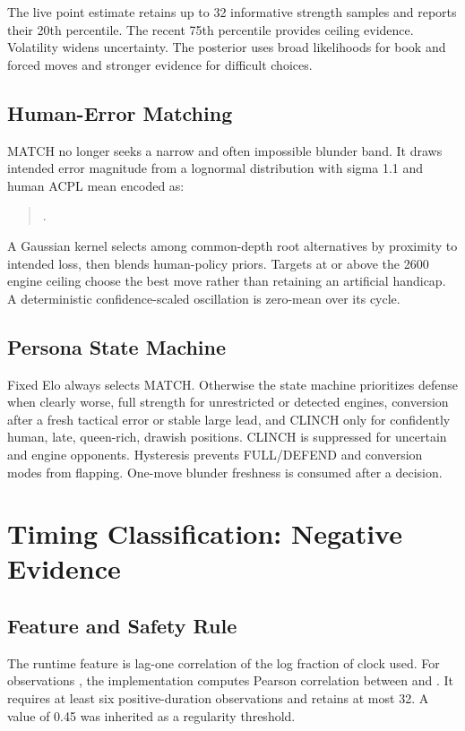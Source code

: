 \documentclass[conference]{IEEEtranSSP}
\newcommand{\code}[1]{\texttt{\detokenize{#1}}}
\begin{document}
The live point estimate retains up to 32 informative strength samples and reports their 20th percentile. The recent 75th percentile provides ceiling evidence. Volatility widens uncertainty. The posterior uses broad likelihoods for book and forced moves and stronger evidence for difficult choices.

\subsection{Human-Error Matching}
MATCH no longer seeks a narrow and often impossible blunder band. It draws intended error magnitude from a lognormal distribution with sigma 1.1 and human ACPL mean encoded as:

\begin{quote}
\code{ACPL_human(E) = 300 * exp(-E / 900)}.
\end{quote}

A Gaussian kernel selects among common-depth root alternatives by proximity to intended loss, then blends human-policy priors. Targets at or above the 2600 engine ceiling choose the best move rather than retaining an artificial handicap. A deterministic confidence-scaled oscillation is zero-mean over its cycle.

\subsection{Persona State Machine}
Fixed Elo always selects MATCH. Otherwise the state machine prioritizes defense when clearly worse, full strength for unrestricted or detected engines, conversion after a fresh tactical error or stable large lead, and CLINCH only for confidently human, late, queen-rich, drawish positions. CLINCH is suppressed for uncertain and engine opponents. Hysteresis prevents FULL/DEFEND and conversion modes from flapping. One-move blunder freshness is consumed after a decision.

\section{Timing Classification: Negative Evidence}
\subsection{Feature and Safety Rule}
The runtime feature is lag-one correlation of the log fraction of clock used. For observations \code{x[0] ... x[n-1]}, the implementation computes Pearson correlation between \code{x[0:n-1]} and \code{x[1:n]}. It requires at least six positive-duration observations and retains at most 32. A value of 0.45 was inherited as a regularity threshold.
\end{document}
